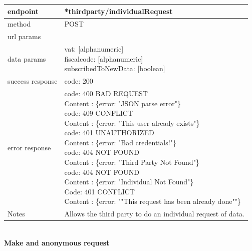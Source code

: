 \begin{legal}
\begin{legal}
\begin{itemize}
							\begin{tabularx}{\linewidth}{| l| l }
								\hline
								endpoint & *thirdparty/individualRequest \\
								\hline
								method & POST \\
								\hline
								url params & \\
								\hline
								data params &
								\parbox{0.7\textwidth}{
									\bigskip
									vat: [alphanumeric]\\
									fiscalcode: [alphanumeric]\\
									subscribedToNewData: [boolean]
									\bigskip
								} \\
								\hline
								success response &
								\parbox{0.7\textwidth}{
									\bigskip
									code: 200
									\bigskip
								} \\
								\hline
								error response &
								\parbox{0.7\textwidth}{
									\bigskip
									code: 400 BAD REQUEST \\
									Content : \{error: "JSON parse error"\}\\
									code: 409 CONFLICT \\
									Content : \{error: "This user already exists"\}\\
									code: 401 UNAUTHORIZED \\
									Content : \{error: "Bad credentials!"\}\\
									code: 404 NOT FOUND \\
									Content : \{error: "Third Party Not Found"\}\\
									code: 404 NOT FOUND \\
									Content : \{error: "Individual Not Found"\}\\
									Code: 401 CONFLICT \\
									Content : \{error: ""This request has been already done""\}\\
									\bigskip
								} \\
								\hline
								Notes & 
								\parbox{0.7\textwidth}{
									\bigskip Allows the third party to do an individual request of data.
								\bigskip}  \\
								\hline
							\end{tabularx}\\
							\newpage
							\textbf{Make and anonymous request} \\
			

\end{itemize}
\end{legal}
\end{legal}
